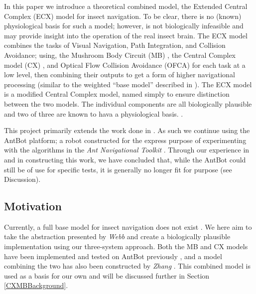 \documentclass[a4paper,11pt,twoside,openright]{article}
\begin{document}
In this paper we introduce a theoretical combined model, the Extended
Central Complex (ECX) model for insect navigation. To be clear, there
is no (known) physiological basis for such a model; however, is not
biologically infeasible and may provide insight into the operation of
the real insect brain. The ECX model combines the tasks of Visual
Navigation, Path Integration, and Collision Avoidance; using, the
Mushroom Body Circuit (MB) \cite{Ardin2016}, the Central Complex model
(CX) \cite{Stone2017}, and Optical Flow Collision Avoidance (OFCA)
\cite{Mitchell2018, Stewart2010} for each task at a low level, then
combining their outputs to get a form of higher navigational processing
(similar to the weighted ``base model'' described in \cite{Webb2019}).
The ECX model is a modified Central Complex model, named simply to
ensure distinction between the two models. The individual components
are all biologically plausible and two of three are known to hava a
physiological basis. \cite{Ardin2016, Stone2017, Mitchell2018,
  Stewart2010, Julien2017}.
\newline
\par

This project primarily extends the work done in
\cite{Mitchell2018}. As such we continue using the AntBot platform; a
robot constructed for the express purpose of experimenting with the
algorithms in the \textit{Ant Navigational Toolkit}
\cite{Eberding2016, Wehner2009}. Through our experience in
\cite{Mitchell2018} and in constructing this work, we have concluded
that, while the AntBot could still be of use for specific tests, it is
generally no longer fit for purpose (see Discussion).

\subsection{ Motivation }
Currently, a full base model for insect navigation does not exist
\cite{Webb2019}. We here aim to take the abstraction presented by
\textit{Webb} and create a biologically plausible implementation using
our three-system approach. Both the MB and CX models have been
implemented and tested on AntBot previously \cite{Scimeca2017,
  Mitchell2018, Eberding2016, Zhang2017}, and a model combining the
two has also been constructed by \textit{Zhang} \cite{Zhang2017}.
This combined model is used as a basis for our own and will be
discussed further in Section \ref{CXMBBackground}.
\newline
\par
\end{document}
